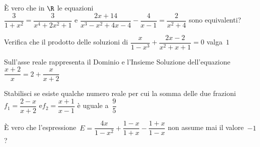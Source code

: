 \begin{esercizio}[*]
\label{ese:3.49}
È vero che in \(\R\) le equazioni\\
\(\dfrac{3}{1 + x^{2}} = \dfrac{3}{x^{4} +2 x^{2} + 1}\) e 
\(\dfrac{2 x + 14}{x^{3}-x^{2} + 4 x-4}-\dfrac{4}{x-1} =
  \dfrac{2}{x^{2} + 4}\) 
sono equivalenti?
\end{esercizio}

\begin{esercizio}[*]
\label{ese:3.50}
Verifica che il prodotto delle soluzioni di 
\(\dfrac{x}{1-x^{3}} + \dfrac{2 x-2}{x^{2} + x + 1}=0\) valga~\(1\)
\end{esercizio}

\begin{esercizio}[*]
\label{ese:3.51}
Sull'asse reale rappresenta il Dominio e l'Insieme Soluzione 
dell'equazione\\ 
\(\dfrac{x + 2}{x}=2+\dfrac{x}{x + 2}\)
\end{esercizio}

\begin{esercizio}[*]
\label{ese:3.52}
Stabilisci se esiste qualche numero reale per cui la somma delle due 
frazioni \\
\(f_{1}=\dfrac{2-x}{x + 2}\) e\(f_{2}=\dfrac{x + 1}{x-1}\) è uguale 
a~\(\dfrac{9}{5}\)
\end{esercizio}

\begin{esercizio}[*]
\label{ese:3.53}
È vero che l'espressione~\(E=\dfrac{4 x}{1-x^{2}} + \dfrac{1-x}{1 + 
x}-\dfrac{1 + x}{1-x}\) non assume mai il valore~\(-1\)?
\end{esercizio}

